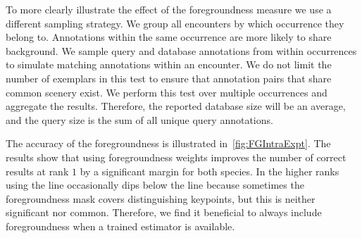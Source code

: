         To more clearly illustrate the effect of the foregroundness measure we use a different sampling strategy.
        We group all encounters by which occurrence they belong to. Annotations within the same occurrence are more
        likely to share background. We sample query and database annotations from within occurrences to simulate
        matching annotations within an encounter. We do not limit the number of exemplars in this test to ensure
        that annotation pairs that share common scenery exist. We perform this test over multiple occurrences and
        aggregate the results. Therefore, the reported database size will be an average, and the query size is the
        sum of all unique query annotations.

        The accuracy of the foregroundness is illustrated in~\cref{fig:FGIntraExpt}. The results show that using
        foregroundness weights improves the number of correct results at rank $1$ by a significant margin for both
        species. In the higher ranks using the  line occasionally dips below the  line
        because sometimes the foregroundness mask covers distinguishing keypoints, but this is neither significant
        nor common. Therefore, we find it beneficial to always include foregroundness when a trained estimator is
        available.

        \FGIntraExpt{}

     
